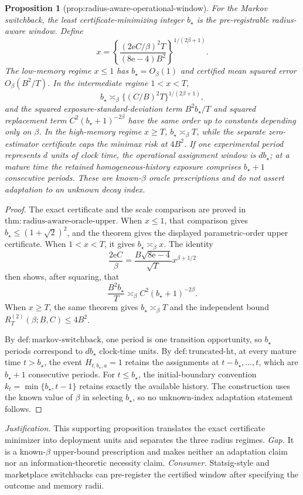 \documentclass{article}
\newtheorem{proposition}{Proposition}
\begin{document}
\begin{proposition}[prop:radius-aware-operational-window]\label{prop:radius-aware-operational-window}
For the Markov switchback, the least certificate-minimizing integer \(b_\star\) is the pre-registrable radius-aware window.  Define
\[
 x=\left\{
 \frac{(2\mathrm e C/\beta)^2T}{(8\mathrm e-4)B^2}
 \right\}^{1/(2\beta+1)}.
\]
The low-memory regime \(x\le1\) has \(b_\star=O_\beta(1)\) and certified mean squared error \(O_\beta(B^2/T)\).  In the intermediate regime \(1<x<T\),
\[
 b_\star\asymp_\beta\{(C/B)^2T\}^{1/(2\beta+1)},
\]
and the squared exposure-standard-deviation term \(B^2b_\star/T\) and squared replacement term \(C^2(b_\star+1)^{-2\beta}\) have the same order up to constants depending only on \(\beta\).  In the high-memory regime \(x\ge T\), \(b_\star\asymp_\beta T\), while the separate zero-estimator certificate caps the minimax risk at \(4B^2\).  If one experimental period represents \(d\) units of clock time, the operational assignment window is \(db_\star\); at a mature time the retained homogeneous-history exposure comprises \(b_\star+1\) consecutive periods.  These are known-\(\beta\) oracle prescriptions and do not assert adaptation to an unknown decay index.
\end{proposition}
\begin{proof}
The exact certificate and the scale comparison are proved in \(\mathrm{thm{:}radius\mbox{-}aware\mbox{-}oracle\mbox{-}upper}\).  When \(x\le1\), that comparison gives \(b_\star\le(1+\sqrt2)^2\), and the theorem gives the displayed parametric-order upper certificate.  When \(1<x<T\), it gives \(b_\star\asymp_\beta x\).  The identity
\[
 \frac{2\mathrm e C}{\beta}
 =\frac{B\sqrt{8\mathrm e-4}}{\sqrt T}x^{\beta+1/2}
\]
then shows, after squaring, that
\[
 \frac{B^2b_\star}{T}
 \asymp_\beta C^2(b_\star+1)^{-2\beta}.
\]
When \(x\ge T\), the same theorem gives \(b_\star\asymp_\beta T\) and the independent bound \(R_T^{(2)}(\beta;B,C)\le4B^2\).

By \(\mathrm{def{:}markov\mbox{-}switchback}\), one period is one transition opportunity, so \(b_\star\) periods correspond to \(db_\star\) clock-time units.  By \(\mathrm{def{:}truncated\mbox{-}ht}\), at every mature time \(t>b_\star\), the event \(H_{t,b_\star,a}=1\) retains the assignments at \(t-b_\star,\ldots,t\), which are \(b_\star+1\) consecutive periods.  For \(t\le b_\star\), the initial-boundary convention \(k_t=\min\{b_\star,t-1\}\) retains exactly the available history.  The construction uses the known value of \(\beta\) in selecting \(b_\star\), so no unknown-index adaptation statement follows.
\end{proof}
\par\smallskip\noindent \textit{Justification.} This supporting proposition translates the exact certificate minimizer into deployment units and separates the three radius regimes. \textit{Gap.} It is a known-\(\beta\) upper-bound prescription and makes neither an adaptation claim nor an information-theoretic necessity claim. \textit{Consumer.} Statsig-style and marketplace switchbacks can pre-register the certified window after specifying the outcome and memory radii.
\end{document}
